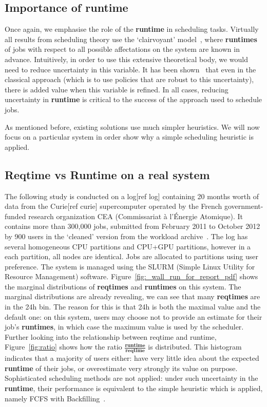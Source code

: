 \documentclass{article}
\begin{document}
\subsection{Importance of \textbf{runtime}}
\label{sub:importance_of_runtime}
Once again, we emphasise the role of the \textbf{runtime} in scheduling tasks. Virtually all results from scheduling theory use the `clairvoyant' model~\cite{handbook-of-scheduling}, where \textbf{runtimes} of jobs with respect to all possible affectations on the system are known in advance.
Intuitively, in order to use this extensive theoretical body, we would need to reduce uncertainty in this variable.
It has been shown~\cite{tsafir} that even in the classical approach (which is to use policies that are robust to this uncertainty), there is added value when this variable is refined.
In all cases, reducing uncertainty in \textbf{runtime} is critical to the success of the approach used to schedule jobs.

As mentioned before, existing solutions use much simpler heuristics. We will now focus on a particular system in order show why a simple scheduling heuristic is applied.

\subsection{Reqtime vs Runtime on a real system}
\label{sub:reqtime_vs_runtime_on_a_real_system}
The following study is conducted on a log[ref log] containing 20 months worth of data from the Curie[ref curie] supercomputer operated by the French government-funded research organization CEA (Commissariat à l'Énergie Atomique).
It contains more than 300,000 jobs, submitted from February 2011 to October 2012 by 900 users in the `cleaned' version from the workload archive~\cite{workloadarchive}.
The log has several homogeneous CPU partitions and CPU+GPU partitions, however in a each partition, all nodes are identical.
Jobs are allocated to partitions using user preference. The system is managed using the SLURM (Simple Linux Utility for Resource Management) software.
Figure~\ref{fig:_wall_run_for_report_pdf} shows the marginal distributions of \textbf{reqtimes} and \textbf{runtimes} on this system. The marginal distributions are already revealing, we can see that many \textbf{reqtimes} are in the 24h bin.
The reason for this is that 24h is both the maximal value and the default one: on this system, users may choose not to provide an estimate for their job's \textbf{runtimes}, in which case the maximum value is used by the scheduler.
Further looking into the relationship between reqtime and runtime, Figure~\ref{fig:ratio} shows how the ratio $\frac{\textbf{runtime}}{\textbf{reqtime}}$ is distributed. This histogram indicates that a majority of users either: have very little idea about the expected \textbf{runtime} of their jobs, or overestimate very strongly its value on purpose. Sophisticated scheduling methods are not applied: under such uncertainty in the \textbf{runtime},  their performance is equivalent to the simple heuristic which is applied, namely FCFS with Backfilling~\cite{backfilling}.
\end{document}
